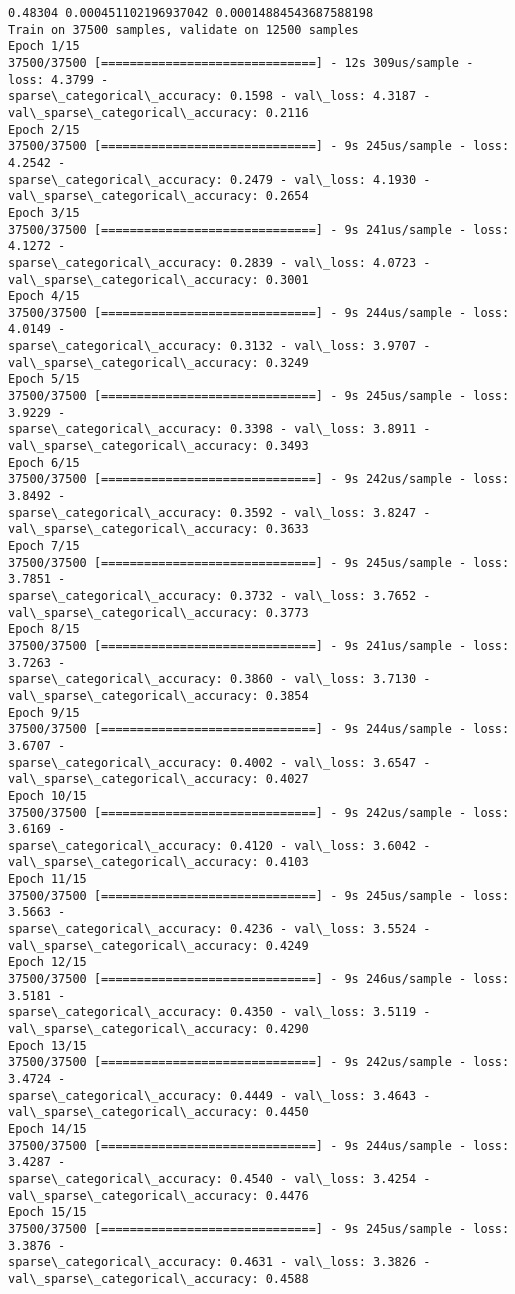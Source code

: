 \documentclass[11pt]{article}
\begin{document}
    \begin{Verbatim}[commandchars=\\\{\}]
0.48304 0.000451102196937042 0.00014884543687588198
Train on 37500 samples, validate on 12500 samples
Epoch 1/15
37500/37500 [==============================] - 12s 309us/sample - loss: 4.3799 -
sparse\_categorical\_accuracy: 0.1598 - val\_loss: 4.3187 -
val\_sparse\_categorical\_accuracy: 0.2116
Epoch 2/15
37500/37500 [==============================] - 9s 245us/sample - loss: 4.2542 -
sparse\_categorical\_accuracy: 0.2479 - val\_loss: 4.1930 -
val\_sparse\_categorical\_accuracy: 0.2654
Epoch 3/15
37500/37500 [==============================] - 9s 241us/sample - loss: 4.1272 -
sparse\_categorical\_accuracy: 0.2839 - val\_loss: 4.0723 -
val\_sparse\_categorical\_accuracy: 0.3001
Epoch 4/15
37500/37500 [==============================] - 9s 244us/sample - loss: 4.0149 -
sparse\_categorical\_accuracy: 0.3132 - val\_loss: 3.9707 -
val\_sparse\_categorical\_accuracy: 0.3249
Epoch 5/15
37500/37500 [==============================] - 9s 245us/sample - loss: 3.9229 -
sparse\_categorical\_accuracy: 0.3398 - val\_loss: 3.8911 -
val\_sparse\_categorical\_accuracy: 0.3493
Epoch 6/15
37500/37500 [==============================] - 9s 242us/sample - loss: 3.8492 -
sparse\_categorical\_accuracy: 0.3592 - val\_loss: 3.8247 -
val\_sparse\_categorical\_accuracy: 0.3633
Epoch 7/15
37500/37500 [==============================] - 9s 245us/sample - loss: 3.7851 -
sparse\_categorical\_accuracy: 0.3732 - val\_loss: 3.7652 -
val\_sparse\_categorical\_accuracy: 0.3773
Epoch 8/15
37500/37500 [==============================] - 9s 241us/sample - loss: 3.7263 -
sparse\_categorical\_accuracy: 0.3860 - val\_loss: 3.7130 -
val\_sparse\_categorical\_accuracy: 0.3854
Epoch 9/15
37500/37500 [==============================] - 9s 244us/sample - loss: 3.6707 -
sparse\_categorical\_accuracy: 0.4002 - val\_loss: 3.6547 -
val\_sparse\_categorical\_accuracy: 0.4027
Epoch 10/15
37500/37500 [==============================] - 9s 242us/sample - loss: 3.6169 -
sparse\_categorical\_accuracy: 0.4120 - val\_loss: 3.6042 -
val\_sparse\_categorical\_accuracy: 0.4103
Epoch 11/15
37500/37500 [==============================] - 9s 245us/sample - loss: 3.5663 -
sparse\_categorical\_accuracy: 0.4236 - val\_loss: 3.5524 -
val\_sparse\_categorical\_accuracy: 0.4249
Epoch 12/15
37500/37500 [==============================] - 9s 246us/sample - loss: 3.5181 -
sparse\_categorical\_accuracy: 0.4350 - val\_loss: 3.5119 -
val\_sparse\_categorical\_accuracy: 0.4290
Epoch 13/15
37500/37500 [==============================] - 9s 242us/sample - loss: 3.4724 -
sparse\_categorical\_accuracy: 0.4449 - val\_loss: 3.4643 -
val\_sparse\_categorical\_accuracy: 0.4450
Epoch 14/15
37500/37500 [==============================] - 9s 244us/sample - loss: 3.4287 -
sparse\_categorical\_accuracy: 0.4540 - val\_loss: 3.4254 -
val\_sparse\_categorical\_accuracy: 0.4476
Epoch 15/15
37500/37500 [==============================] - 9s 245us/sample - loss: 3.3876 -
sparse\_categorical\_accuracy: 0.4631 - val\_loss: 3.3826 -
val\_sparse\_categorical\_accuracy: 0.4588
    \end{Verbatim}
\end{document}
